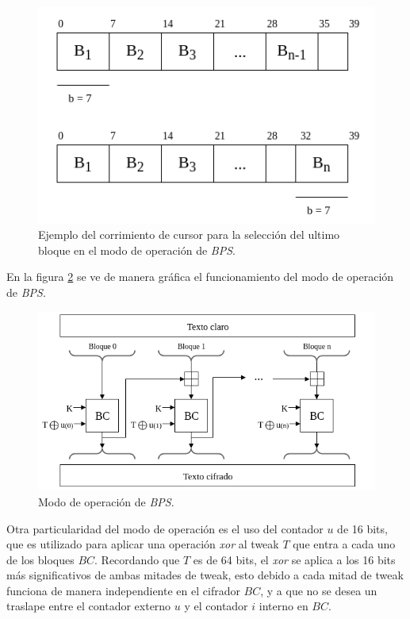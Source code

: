 \begin{figure}[H]
  \begin{center}
    \includegraphics[width=0.5\linewidth]{diagramas/cursor_bps}
    \caption{Ejemplo del corrimiento de cursor para la selección del ultimo 
      bloque en el modo de operación de \textit{BPS}.}
    \label{cursor_BPS}
   \end{center}
\end{figure}

En la figura \ref{modo_de_operacion_BPS} se ve de manera gráfica el 
funcionamiento del modo de operación de \textit{BPS}.

\begin{figure}[H]
  \begin{center}
    \includegraphics[width=0.85\linewidth]{diagramas/modo_de_operacion_bps}
    \caption{Modo de operación de \textit{BPS}.}
    \label{modo_de_operacion_BPS}
   \end{center}
\end{figure}

Otra particularidad del modo de operación es el uso del contador $u$ de 16 
bits, que es utilizado para aplicar una operación \textit{xor} al tweak $T$ 
que entra a cada uno de los bloques $BC$. Recordando que $T$ es de 64 bits, 
el \textit{xor} se aplica a los 16 bits más significativos de ambas mitades 
de tweak, esto debido a cada mitad de tweak funciona de manera independiente 
en el cifrador $BC$, y a que no se desea un traslape entre el contador externo 
$u$ y el contador $i$ interno en $BC$.

